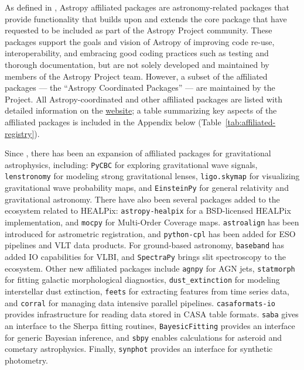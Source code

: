 \documentclass[modern]{aastex631}
\begin{document}
As defined in \paperii, Astropy affiliated packages are astronomy-related
\python packages that provide functionality that builds upon and extends the
\astropypkg core package that have requested to be included as part of the
Astropy Project community. These packages support the goals and vision of
Astropy of improving code re-use, interoperability, and embracing good coding
practices such as testing and thorough documentation, but are not solely
developed and maintained by members of the Astropy Project team.
However, a subset of the affiliated packages --- the ``Astropy Coordinated
Packages'' --- are maintained by the Project.
All Astropy-coordinated and other affiliated packages are listed with detailed
information on the \href{{https://www.astropy.org/affiliated}}{\astropy
website}; a table summarizing key aspects of the affiliated packages is included
in the Appendix below (Table~\ref{tab:affiliated-registry}).

Since \paperii, there has been an expansion of affiliated
packages for gravitational astrophysics, including:
\texttt{PyCBC} for exploring gravitational wave signals, \texttt{lenstronomy} for
modeling strong gravitational lenses, \texttt{ligo.skymap} for visualizing
gravitational wave probability maps, and \texttt{EinsteinPy} for general
relativity and gravitational astronomy. There have also been several packages
added to the ecosystem related to HEALPix: \texttt{astropy-healpix}
for a BSD-licensed HEALPix implementation, and \texttt{mocpy} for Multi-Order
Coverage maps. \texttt{astroalign} has been introduced for astrometric registration,
and \texttt{python-cpl} has been added for ESO pipelines and VLT data products.
For ground-based astronomy, \texttt{baseband} has added IO capabilities for
VLBI, and \texttt{SpectraPy} brings slit spectroscopy to the \astropy ecosystem.
Other new affiliated packages include \texttt{agnpy} for AGN jets,
\texttt{statmorph} for fitting galactic morphological diagnostics,
\texttt{dust\_extinction} for modeling interstellar dust extinction,
\texttt{feets} for extracting features from time series data, and
\texttt{corral} for managing data intensive parallel pipelines.
\texttt{casaformats-io} provides infrastructure for reading data stored in CASA table formats.
\texttt{saba} gives an interface to the Sherpa \citep{sherpa} fitting routines,
\texttt{BayesicFitting} provides an interface for generic Bayesian inference,
and \texttt{sbpy} enables calculations for asteroid and
cometary astrophysics. Finally, \texttt{synphot} provides an interface for
synthetic photometry.
\end{document}
